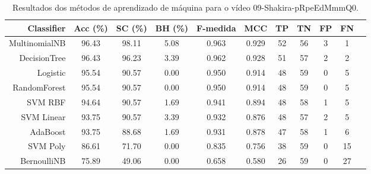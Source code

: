 \begin{table}[!htb]
\centering
\caption{Resultados dos métodos de aprendizado de máquina para o vídeo 09-Shakira-pRpeEdMmmQ0.}
\label{tab:09-Shakira-pRpeEdMmmQ0}
\begin{tabular}{r|c|c|c|c|c|c|c|c|c|c}
\hline\hline
Classifier & Acc (\%) & SC (\%) & BH (\%) & F-medida & MCC & TP & TN & FP & FN \\ \hline
MultinomialNB & 96.43 & 98.11 & 5.08 & 0.963 & 0.929 & 52 & 56 & 3 & 1 \\ 
DecisionTree & 96.43 & 96.23 & 3.39 & 0.962 & 0.928 & 51 & 57 & 2 & 2 \\ 
Logistic & 95.54 & 90.57 & 0.00 & 0.950 & 0.914 & 48 & 59 & 0 & 5 \\ 
RandomForest & 95.54 & 90.57 & 0.00 & 0.950 & 0.914 & 48 & 59 & 0 & 5 \\ 
SVM RBF & 94.64 & 90.57 & 1.69 & 0.941 & 0.894 & 48 & 58 & 1 & 5 \\ 
SVM Linear & 93.75 & 90.57 & 3.39 & 0.932 & 0.876 & 48 & 57 & 2 & 5 \\ 
AdaBoost & 93.75 & 88.68 & 1.69 & 0.931 & 0.878 & 47 & 58 & 1 & 6 \\ 
SVM Poly & 86.61 & 71.70 & 0.00 & 0.835 & 0.756 & 38 & 59 & 0 & 15 \\ 
BernoulliNB & 75.89 & 49.06 & 0.00 & 0.658 & 0.580 & 26 & 59 & 0 & 27 \\ 
\hline\hline
\end{tabular}
\end{table}
